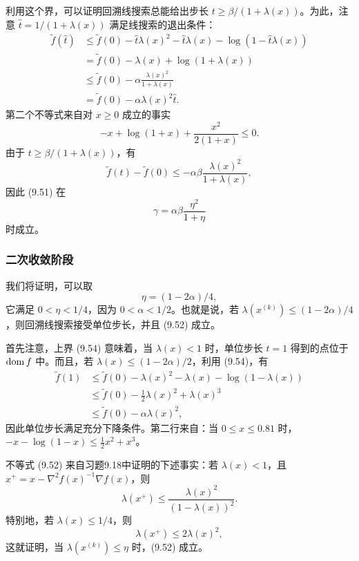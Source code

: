 利用这个界，可以证明回溯线搜索总能给出步长 $t\ge\beta/(1+\lambda(x))$。为此，注意 $\hat t=1/(1+\lambda(x))$ 满足线搜索的退出条件：
\[
\begin{aligned}
 \widetilde f(\hat t)&\le\widetilde f(0)-\hat t\lambda(x)^2-\hat t\lambda(x)
 -\log(1-\hat t\lambda(x))\\
 &=\widetilde f(0)-\lambda(x)+\log(1+\lambda(x))\\
 &\le\widetilde f(0)-\alpha\frac{\lambda(x)^2}{1+\lambda(x)}\\
 &=\widetilde f(0)-\alpha\lambda(x)^2\hat t.
\end{aligned}
\]
第二个不等式来自对 $x\ge0$ 成立的事实
\[
 -x+\log(1+x)+\frac{x^2}{2(1+x)}\le0.
\]
由于 $t\ge\beta/(1+\lambda(x))$，有
\[
 \widetilde f(t)-\widetilde f(0)\le-\alpha\beta\frac{\lambda(x)^2}{1+\lambda(x)},
\]
因此 (9.51) 在
\[
 \gamma=\alpha\beta\frac{\eta^2}{1+\eta}
\]
时成立。

\subsubsection*{二次收敛阶段}
我们将证明，可以取
\[
 \eta=(1-2\alpha)/4,
\]
它满足 $0<\eta<1/4$，因为 $0<\alpha<1/2$。也就是说，若 $\lambda(x^{(k)})\le(1-2\alpha)/4$，则回溯线搜索接受单位步长，并且 (9.52) 成立。

首先注意，上界 (9.54) 意味着，当 $\lambda(x)<1$ 时，单位步长 $t=1$ 得到的点位于 $\operatorname{dom} f$ 中。而且，若 $\lambda(x)\le(1-2\alpha)/2$，利用 (9.54)，有
\[
\begin{aligned}
 \widetilde f(1)&\le\widetilde f(0)-\lambda(x)^2-\lambda(x)-\log(1-\lambda(x))\\
 &\le\widetilde f(0)-\tfrac12\lambda(x)^2+\lambda(x)^3\\
 &\le\widetilde f(0)-\alpha\lambda(x)^2,
\end{aligned}
\]
因此单位步长满足充分下降条件。第二行来自：当 $0\le x\le0.81$ 时，$-x-\log(1-x)\le\tfrac12x^2+x^3$。

不等式 (9.52) 来自习题9.18中证明的下述事实：若 $\lambda(x)<1$，且 $x^+=x-\nabla^2f(x)^{-1}\nabla f(x)$，则
\begin{equation}
 \lambda(x^+)\le\frac{\lambda(x)^2}{(1-\lambda(x))^2}.\tag{9.55}
\end{equation}
特别地，若 $\lambda(x)\le1/4$，则
\[
 \lambda(x^+)\le2\lambda(x)^2,
\]
这就证明，当 $\lambda(x^{(k)})\le\eta$ 时，(9.52) 成立。


